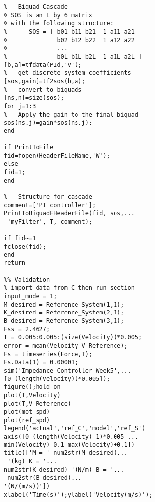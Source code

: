 \begin{verbatim}
%---Biquad Cascade
% SOS is an L by 6 matrix 
% with the following structure:
%      SOS = [ b01 b11 b21  1 a11 a21  
%              b02 b12 b22  1 a12 a22
%              ...
%              b0L b1L b2L  1 a1L a2L ]
[b,a]=tfdata(PId,'v');       
%---get discrete system coefficients
[sos,gain]=tf2sos(b,a);     
%---convert to biquads
[ns,n]=size(sos);
for j=1:3                   
%---Apply the gain to the final biquad
sos(ns,j)=gain*sos(ns,j);
end

if PrintToFile
fid=fopen(HeaderFileName,'W');    
else
fid=1;   
end

%---Structure for cascade
comment=['PI controller'];
PrintToBiquadFHeaderFile(fid, sos,...
 'myFilter', T, comment);

if fid~=1
fclose(fid);
end 
return

%% Validation
% import data from C then run section
input_mode = 1;
M_desired = Reference_System(1,1);
K_desired = Reference_System(2,1);
B_desired = Reference_System(3,1);
Fss = 2.4627;
T = 0.005:0.005:(size(Velocity))*0.005;
error = mean(Velocity-V_Reference);
Fs = timeseries(Force,T);
Fs.Data(1) = 0.00001;
sim('Impedance_Controller_Week5',...
[0 (length(Velocity))*0.005]);
figure();hold on
plot(T,Velocity)
plot(T,V_Reference)
plot(mot_spd)
plot(ref_spd)
legend('actual','ref_C','model','ref_S')
axis([0 (length(Velocity)-1)*0.005 ...
min(Velocity)-0.1 max(Velocity)+0.1])
title(['M = ' num2str(M_desired)...
 '(kg) K = '...
num2str(K_desired) '(N/m) B = '...
 num2str(B_desired)...
'(N/(m/s))'])
xlabel('Time(s)');ylabel('Velocity(m/s)');
\end{verbatim}
